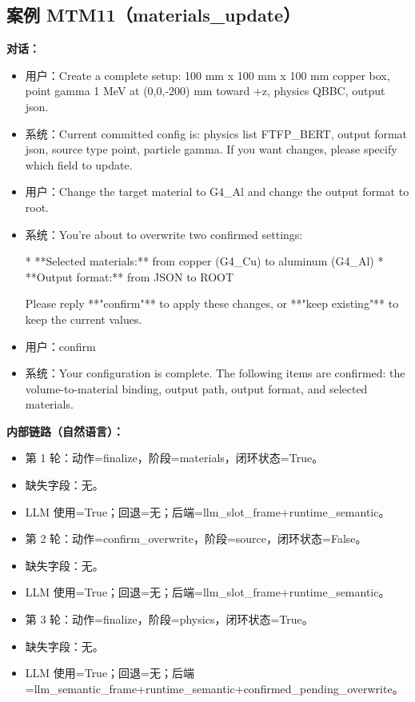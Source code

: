 \documentclass[11pt]{ctexart}
\begin{document}
\subsection{案例 MTM11（materials\_update）}
\textbf{对话：}
\begin{itemize}
\item 用户：Create a complete setup: 100 mm x 100 mm x 100 mm copper box, point gamma 1 MeV at (0,0,-200) mm toward +z, physics QBBC, output json.
\item 系统：Current committed config is: physics list FTFP\_BERT, output format json, source type point, particle gamma. If you want changes, please specify which field to update.
\item 用户：Change the target material to G4\_Al and change the output format to root.
\item 系统：You're about to overwrite two confirmed settings:

*   **Selected materials:** from copper (G4\_Cu) to aluminum (G4\_Al)
*   **Output format:** from JSON to ROOT

Please reply **"confirm"** to apply these changes, or **"keep existing"** to keep the current values.
\item 用户：confirm
\item 系统：Your configuration is complete. The following items are confirmed: the volume-to-material binding, output path, output format, and selected materials.
\end{itemize}
\textbf{内部链路（自然语言）：}
\begin{itemize}
\item 第 1 轮：动作=finalize，阶段=materials，闭环状态=True。
\item 缺失字段：无。
\item LLM 使用=True；回退=无；后端=llm\_slot\_frame+runtime\_semantic。
\item 第 2 轮：动作=confirm\_overwrite，阶段=source，闭环状态=False。
\item 缺失字段：无。
\item LLM 使用=True；回退=无；后端=llm\_slot\_frame+runtime\_semantic。
\item 第 3 轮：动作=finalize，阶段=physics，闭环状态=True。
\item 缺失字段：无。
\item LLM 使用=True；回退=无；后端=llm\_semantic\_frame+runtime\_semantic+confirmed\_pending\_overwrite。
\end{itemize}
\end{document}
